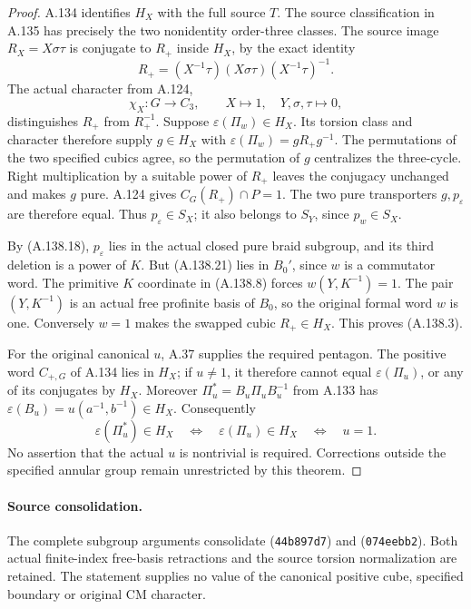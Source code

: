 \begin{proof}
A.134 identifies \(H_X\) with the full source \(T\).
The source classification in A.135 has precisely the two
nonidentity order-three classes. The source image
\(R_X=X\sigma\tau\) is conjugate to \(R_+\) inside
\(H_X\), by the exact identity
\[
 R_+=(X^{-1}\tau)(X\sigma\tau)(X^{-1}\tau)^{-1}.
\tag{A.138.22}
\]
The actual character from A.124,
\[
 \chi_X:G\longrightarrow C_3,\qquad
 X\longmapsto1,\quad Y,\sigma,\tau\longmapsto0 ,
\]
distinguishes \(R_+\) from \(R_+^{-1}\).
Suppose \(\varepsilon(\Pi_w)\in H_X\).
Its torsion class and character therefore supply
\(g\in H_X\) with
\(\varepsilon(\Pi_w)=gR_+g^{-1}\).
The permutations of the two specified cubics agree, so the
permutation of \(g\) centralizes the three-cycle.
Right multiplication by a suitable power of \(R_+\)
leaves the conjugacy unchanged and makes \(g\) pure.
A.124 gives \(C_G(R_+)\cap P=1\). The two pure
transporters \(g,p_\varepsilon\) are therefore equal.
Thus \(p_\varepsilon\in S_X\); it also belongs to \(S_Y\),
since \(p_w\in S_X\).

By (A.138.18), \(p_\varepsilon\) lies in the actual closed
pure braid subgroup, and its third deletion is a power of
\(K\). But (A.138.21) lies in \(B_0'\), since \(w\) is a
commutator word. The primitive \(K\) coordinate in
(A.138.8) forces \(w(Y,K^{-1})=1\).
The pair \((Y,K^{-1})\) is an actual free profinite basis
of \(B_0\), so the original formal word \(w\) is one.
Conversely \(w=1\) makes the swapped cubic \(R_+\in H_X\).
This proves (A.138.3).

For the original canonical \(u\), A.37 supplies the required
pentagon. The positive word \(C_{+,G}\) of A.134 lies
in \(H_X\); if \(u\ne1\), it therefore cannot equal
\(\varepsilon(\Pi_u)\), or any of its conjugates by \(H_X\).
Moreover
\(\Pi_u^*=B_u\Pi_uB_u^{-1}\) from A.133 has
\(\varepsilon(B_u)=u(a^{-1},b^{-1})\in H_X\).
Consequently
\[
 \varepsilon(\Pi_u^*)\in H_X
       \quad\Longleftrightarrow\quad
 \varepsilon(\Pi_u)\in H_X
       \quad\Longleftrightarrow\quad u=1 .
\tag{A.138.23}
\]
No assertion that the actual \(u\) is nontrivial is required.
Corrections outside the specified annular group remain
unrestricted by this theorem.
\end{proof}

\paragraph{Source consolidation.}
The complete subgroup arguments consolidate
(\texttt{44b897d7}) and
(\texttt{074eebb2}). Both actual finite-index free-basis
retractions and the source torsion normalization are retained.
The statement supplies no value of the canonical positive cube,
specified boundary or original CM character.

